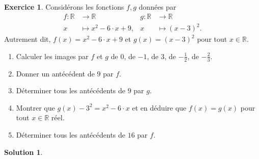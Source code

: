 \documentclass[a4paper, 14pt]{extarticle}
\theoremstyle{plain}
\newtheorem*{sol}{Solution}
\theoremstyle{definition}
\newtheorem{ex}{Exercice}
\newcommand{\R}{\mathbb{R}}
\newcommand{\exe}[2]{
		\begin{ex} #1  \end{ex}
		\begin{sol} #2 \end{sol}
	}
\newcommand{\exe}[2]{
		\begin{ex} #1  \end{ex}
	}
\begin{document}
	\exe{
		Considérons les fonctions $f,g$ données par
		\begin{align*}
			f: \R & \longrightarrow \R &g: \R & \longrightarrow \R \\
			x& \longmapsto x^2 -6\cdot x + 9,  &x& \longmapsto (x-3)^2. 
		\end{align*}
		Autrement dit, $f(x) =x^2 -6\cdot x + 9$ et $g(x)=(x-3)^2$ pour tout $x\in\R$.
		
		\begin{enumerate}
			\item
			Calculer les images par $f$ et $g$ de $0$, de $-1$, de $3$, de $-\frac12$, de $-\frac23$.
			\item
			Donner un antécédent de $9$ par $f$.
			\item
			Déterminer tous les antécédents de $9$ par $g$.	
			\item
			Montrer que $g(x) - 3^2 = x^2 - 6\cdot x$ et en déduire que $f(x) = g(x)$ pour tout $x\in\R$ réel.
			\item 
			Déterminer tous les antécédents de $16$ par $f$.
		\end{enumerate}
	}{}
\end{document}
